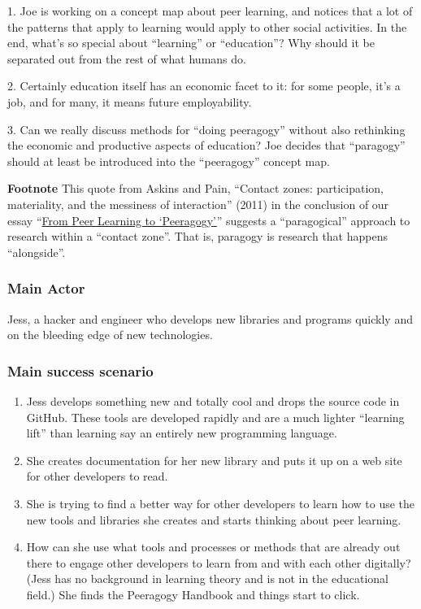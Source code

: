 1. Joe is working on a concept map about peer learning, and notices that
a lot of the patterns that apply to learning would apply to other social
activities. In the end, what's so special about ``learning'' or
``education''? Why should it be separated out from the rest of what
humans do.

2. Certainly education itself has an economic facet to it: for some
people, it's a job, and for many, it means future employability.

3. Can we really discuss methods for ``doing peeragogy'' without also
rethinking the economic and productive aspects of education? Joe decides
that ``paragogy'' should at least be introduced into the ``peeragogy''
concept map.

\textbf{Footnote} This quote from Askins and Pain, ``Contact zones:
participation, materiality, and the messiness of interaction'' (2011) in
the conclusion of our essay
``\href{http://peeragogy.org/to-peeragogy/}{From Peer Learning to
`Peeragogy'}'' suggests a ``paragogical'' approach to research within a
``contact zone''. That is, paragogy is research that happens
``alongside''.

\subsubsection{Main Actor}

Jess, a hacker and engineer who develops new libraries and programs
quickly and on the bleeding edge of new technologies.

\subsubsection{Main success scenario}

\begin{enumerate}
\item
  Jess develops something new and totally cool and drops the source code
  in GitHub. These tools are developed rapidly and are a much lighter
  ``learning lift'' than learning say an entirely new programming
  language.
\item
  She creates documentation for her new library and puts it up on a web
  site for other developers to read.
\item
  She is trying to find a better way for other developers to learn how
  to use the new tools and libraries she creates and starts thinking
  about peer learning.
\item
  How can she use what tools and processes or methods that are already
  out there to engage other developers to learn from and with each other
  digitally? (Jess has no background in learning theory and is not in
  the educational field.) She finds the Peeragogy Handbook and things
  start to click.
\end{enumerate}
